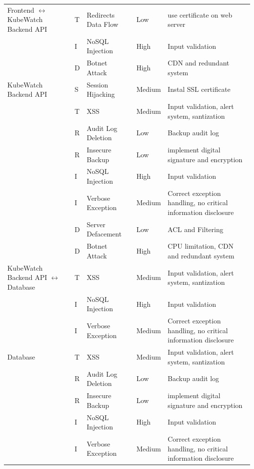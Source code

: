 \begin{longtable}[h!]{p{2.1cm} p{1.8cm} p{3cm} p{2cm} p{3.5cm}}
    \hline
    Frontend  \(\leftrightarrow\) KubeWatch Backend API
                        & T & Redirects Data Flow & Low & use certificate on web server \\
                        & I & NoSQL Injection & High & Input validation \\
                        & D & Botnet Attack & High & CDN and redundant system \\
    \hline
    KubeWatch Backend API
                        & S & Session Hijacking & Medium & Instal SSL certificate \\
                        & T & XSS & Medium & Input validation, alert system, santization \\
                        & R & Audit Log Deletion & Low & Backup audit log \\
                        & R & Insecure Backup & Low & implement digital signature and encryption \\
                        & I & NoSQL Injection & High & Input validation \\
                        & I & Verbose Exception & Medium & Correct exception handling, no critical information disclosure \\
                        & D & Server Defacement & Low & ACL and Filtering \\
                        & D & Botnet Attack & High & CPU limitation, CDN and redundant system \\
    \hline
    KubeWatch Backend API \(\leftrightarrow\) Database
                        & T & XSS & Medium & Input validation, alert system, santization \\
                        & I & NoSQL Injection & High & Input validation \\
                        & I & Verbose Exception & Medium & Correct exception handling, no critical information disclosure \\
    \hline
    Database            & T & XSS & Medium & Input validation, alert system, santization \\
                        & R & Audit Log Deletion & Low & Backup audit log \\
                        & R & Insecure Backup & Low & implement digital signature and encryption \\
                        & I & NoSQL Injection & High & Input validation \\
                        & I & Verbose Exception & Medium & Correct exception handling, no critical information disclosure \\

\end{longtable}
